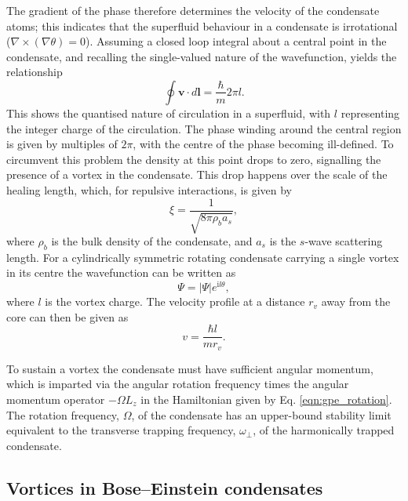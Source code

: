 The gradient of the phase therefore determines the velocity of the condensate atoms; this indicates that the superfluid behaviour in a condensate is irrotational ($\nabla\times(\nabla\theta) =0$). Assuming a closed loop integral about a central point in the condensate, and recalling the single-valued nature of the wavefunction, yields the relationship
\begin{equation}\label{eqn:circulation}
\oint \textbf{v}\cdot d\textbf{l} = \frac{\hbar}{m}2\pi l.
\end{equation}
This shows the quantised nature of circulation in a superfluid, with $l$ representing the integer charge of the circulation. The phase winding around the central region is given by multiples of $2\pi$, with the centre of the phase becoming ill-defined. To circumvent this problem the density at this point drops to zero, signalling the presence of a vortex in the condensate. This drop happens over the scale of the healing length, which, for repulsive interactions, is given by
\begin{equation}
\xi = \frac{1}{\sqrt{8\pi \rho_b a_s}},
\end{equation}
where $\rho_b$ is the bulk density of the condensate, and $a_s$ is the $s$-wave scattering length. For a cylindrically symmetric rotating condensate carrying a single vortex in its centre the wavefunction can be written as
\begin{equation}\label{eqn:madelung_l}
    \Psi = |\Psi|e^{\textrm{i}l\theta},
\end{equation}
where $l$ is the vortex charge. The velocity profile at a distance $r_{v}$ away from the core can then be given as
\begin{equation}\label{eqn:1_over_r}
    v =\frac{\hbar l}{m r_v}.
\end{equation}

To sustain a vortex the condensate must have sufficient angular momentum, which is imparted via the angular rotation frequency times the angular momentum operator $-\Omega L_z$ in the Hamiltonian given by Eq. \eqref{eqn:gpe_rotation}. The rotation frequency, $\Omega$, of the condensate has an upper-bound stability limit equivalent to the transverse trapping frequency, $\omega_{\perp}$, of the harmonically trapped condensate.

\subsection{Vortices in Bose--Einstein condensates}\label{ss:vorticesinbec}

